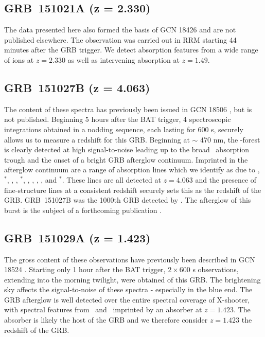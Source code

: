\documentclass[longauth]{aa}    %
\begin{document}
\subsection{GRB~151021A (z = 2.330)}\label{151021}

The data presented here also formed the basis of GCN 18426 \citep{GCN18982} and
are not published elsewhere. The observation was carried out in RRM starting 44
minutes after the GRB trigger. We detect absorption features from a wide range
of ions at $z=2.330$ as well as intervening absorption at $z=1.49$.

\subsection{GRB~151027B (z = 4.063)}\label{151027}

The content of these spectra has previously been issued in GCN 18506
\citep{GCN18506}, but is not published. Beginning 5 hours after the BAT trigger,
4 spectroscopic integrations obtained in a nodding sequence, each lasting for
600 s, securely allows us to measure a redshift for this GRB. Beginning at $\sim$
470 nm, the \lya-forest is clearly detected at high signal-to-noise leading up
to the broad \lya~absorption trough and the onset of a bright GRB afterglow
continuum. Imprinted in the afterglow continuum are a range of absorption lines
which we identify as due to \SIii, \SIii$^*$, \oi, \cii, \cii$^*$, \civ, \alii,
\alii, \feii, and \feii$^*$. These lines are all detected at $z = 4.063$ and the
presence of fine-structure lines at a consistent redshift securely sets this as
the redshift of the GRB. GRB~151027B was the 1000th GRB detected by \swift. The
afterglow of this burst is the subject of a forthcoming publication
\citep{Greiner2018}.

\subsection{GRB~151029A (z = 1.423)}\label{151029}

The gross content of these observations have previously been described in GCN
18524 \citep{GCN18524}. Starting only 1 hour after the BAT trigger, $2 \times
600$ s observations, extending into the morning twilight, were obtained of this
GRB. The brightening sky affects the signal-to-noise of these spectra -
especially in the blue end. The GRB afterglow is well detected over the entire
spectral coverage of X-shooter, with spectral features from \feii~and
\mgii~imprinted by an absorber at $z = 1.423$. The absorber is likely the host
of the GRB and we therefore consider $z = 1.423$ the redshift of the GRB.
\end{document}
